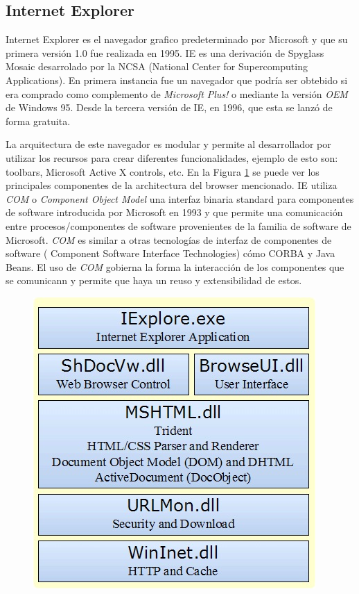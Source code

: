     \subsection{Internet Explorer}
    \label{chap3:IE}
    Internet Explorer es el navegador grafico predeterminado por Microsoft y que su primera versión 1.0 fue realizada en 1995. IE es una derivación de Spyglass Mosaic desarrolado por la NCSA (National Center for Supercomputing Applications). En primera instancia fue un navegador que podría ser obtebido si era comprado como complemento de \textit{Microsoft Plus!} o mediante la versión \textit{OEM} de Windows 95. Desde la tercera versión de IE, en 1996, que esta se lanzó de forma gratuita.
            
    La arquitectura de este navegador es modular y permite al desarrollador por utilizar los recursos para crear diferentes funcionalidades, ejemplo de esto son: toolbars, Microsoft Active X controls, etc. En la Figura \ref{fig:archIE} \cite{webpag3} se puede ver los principales componentes de la architectura del browser mencionado. IE utiliza \textit{COM} o \textit{Component Object Model} una interfaz binaria standard para componentes de software introducida por Microsoft en 1993 y que permite una comunicación entre procesos/componentes de software provenientes de la familia de software de Microsoft. \textit{COM} es similar a otras tecnologías de interfaz de componentes de software ( Component Software Interface Technologies) cómo CORBA y Java Beans. El uso de \textit{COM} gobierna la forma la interacción de los componentes que se comunicann y permite que haya un reuso y extensibilidad de estos.
            
    \begin{figure}[h!t]
        \begin{center}
    		\includegraphics[scale=0.65]{figures/IEArch.jpg}
          \label{fig:archIE}
        \end{center}
    \end{figure}
      
